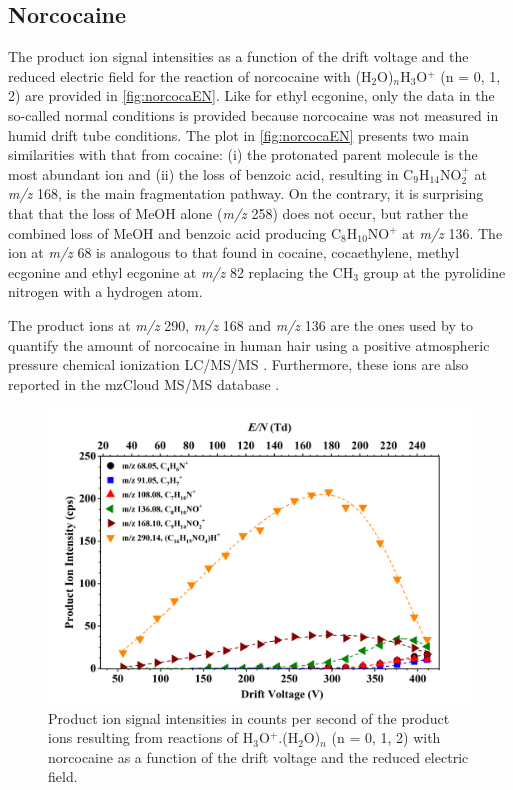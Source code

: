 \subsection{Norcocaine}
The product ion signal intensities as a function of the drift voltage and the reduced electric field for the reaction of norcocaine with (H$_2$O)$_n$H$_3$O$^+$ (n = 0, 1, 2) are provided in \autoref{fig:norcocaEN}.
%
Like for ethyl ecgonine, only the data in the so-called normal conditions is provided because norcocaine was not measured in humid drift tube conditions. 
%
%
%
The plot in \autoref{fig:norcocaEN} presents two main similarities with that from cocaine:
(i) the protonated parent molecule is the most abundant ion and
(ii) the loss of benzoic acid, resulting in C$_{9}$H$_{14}$NO$_2^+$ at \textit{m/z} 168, is the main fragmentation pathway.
%
On the contrary, it is surprising that that the loss of MeOH alone (\textit{m/z} 258)  does not occur, but rather the combined loss of MeOH and benzoic acid producing C$_{8}$H$_{10}$NO$^+$ at \textit{m/z} 136.
%
The ion at \textit{m/z} 68 is analogous to that found in cocaine, cocaethylene, methyl ecgonine and ethyl ecgonine at \textit{m/z} 82 replacing the CH$_3$ group at the pyrolidine nitrogen with a hydrogen atom.

The product ions at \textit{m/z} 290, \textit{m/z} 168 and \textit{m/z} 136 are the ones used by \citeauthor{moore2007determination} to quantify the amount of norcocaine in human hair using a positive atmospheric pressure chemical ionization LC/MS/MS \cite{moore2007determination}.
Furthermore, these ions are also reported in the mzCloud MS/MS database \cite{mzcloud22}.







\begin{figure}[htbp]
\centering
\includegraphics[width=0.8\linewidth]{pics/cocaine-chapter/norcocaine-cps.png}
\caption{Product ion signal intensities in counts per second of the product ions resulting from reactions of H$_3$O$^+$.(H$_2$O)$_n$ (n = 0, 1, 2) with norcocaine as a function of the drift voltage and the reduced electric field.} 
\label{fig:norcocaEN}
\end{figure}


